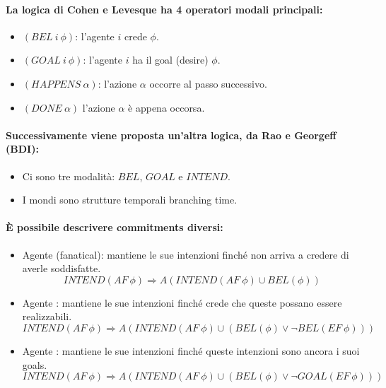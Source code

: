 \paragraph{La logica di Cohen e Levesque ha 4 operatori modali principali:}

\begin{itemize}
  \item $(BEL\: i\: \phi)$: l'agente $i$ crede $\phi$.
  \item $(GOAL\: i\: \phi)$: l'agente $i$ ha il goal (desire) $\phi$. 
  \item $(HAPPENS\:\alpha)$: l'azione $\alpha$ occorre al passo successivo. 
  \item $(DONE\: \alpha)$ l'azione $\alpha$ è appena occorsa.
\end{itemize}


\paragraph{Successivamente viene proposta un'altra logica, da Rao e Georgeff (BDI):}

\begin{itemize}
  \item Ci sono tre modalità: $BEL$, $GOAL$ e $INTEND$. 
  \item I mondi sono strutture temporali branching time. 
\end{itemize}

\paragraph{È possibile descrivere commitments diversi:}

\begin{itemize}
  \item Agente  (fanatical): mantiene le sue intenzioni finché non arriva a credere di averle soddisfatte. $$INTEND(AF\:\phi) \Rightarrow A(INTEND(AF\:\phi) \cup BEL(\phi))$$
  \item Agente : mantiene le sue intenzioni finché crede che queste possano essere realizzabili.  $$INTEND(AF\:\phi) \Rightarrow A(INTEND(AF\:\phi) \cup (BEL(\phi) \lor \neg BEL(EF\:\phi)))$$
  \item Agente : mantiene le sue intenzioni finché queste intenzioni sono ancora i suoi goals. $$INTEND(AF\:\phi) \Rightarrow A(INTEND(AF\:\phi) \cup (BEL(\phi) \lor \neg GOAL(EF\:\phi)))$$
\end{itemize}
\pagebreak
